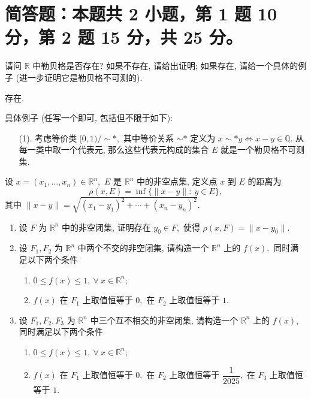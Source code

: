 \section{简答题：本题共 2 小题，第 1 题 10 分，第 2 题 15 分，共 25 分。}


\begin{question}[points = 10]
请问 $\mathbb{R}$ 中勒贝格是否存在? 如果不存在, 请给出证明; 如果存在, 请给一个具体的例子 (进一步证明它是勒贝格不可测的).

\end{question}

\begin{solution}
存在. 

具体例子 (任写一个即可, 包括但不限于如下): 
\begin{itemize}
\item[(1).] 考虑等价类 $[0, 1) / \sim*,$ 其中等价关系 $\sim*$ 定义为 $x \sim* y \Leftrightarrow x - y \in \mathbb{Q}.$
从每一类中取一个代表元, 那么这些代表元构成的集合 $E$ 就是一个勒贝格不可测集.
\end{itemize}
\end{solution}

\begin{question}[points = 15]
设 $x = (x_1, \dots, x_n) \in \mathbb{R}^n,$ $E$ 是 $\mathbb{R}^n$ 中的非空点集, 定义点 $x$ 到 $E$ 的距离为
$$\rho(x, E) = \inf \{ \lVert x - y \rVert: ~ y \in E \},$$
其中 $\lVert x - y \rVert = \sqrt{(x_1 - y_1)^2 + \cdots + (x_n - y_n)^2}.$
\begin{enumerate}
\item 设 $F$ 为 $\mathbb{R}^n$ 中的非空闭集, 证明存在 $y_0 \in F,$ 使得 $\rho(x, F) = \lVert x - y_0 \rVert.$
\item 设 $F_1, F_2$ 为 $\mathbb{R}^n$ 中两个不交的非空闭集, 请构造一个 $\mathbb{R}^n$ 上的 $f(x),$ 同时满足以下两个条件
\begin{enumerate}
\item $0 \leqslant f(x) \leqslant 1, ~ \forall ~ x \in \mathbb{R}^n;$
\item $f(x)$ 在 $F_1$ 上取值恒等于 $0,$ 在 $F_2$ 上取值恒等于 $1.$
\end{enumerate}
\item 设 $F_1, F_2, F_3$ 为 $\mathbb{R}^n$ 中三个互不相交的非空闭集, 请构造一个 $\mathbb{R}^n$ 上的 $f(x),$ 同时满足以下两个条件
\begin{enumerate}
\item $0 \leqslant f(x) \leqslant 1, ~ \forall ~ x \in \mathbb{R}^n;$
\item $f(x)$ 在 $F_1$ 上取值恒等于 $0,$ 在 $F_2$ 上取值恒等于 $\dfrac{1}{2025},$ 在 $F_3$ 上取值恒等于 $1.$
\end{enumerate}
\end{enumerate}

\end{question}

